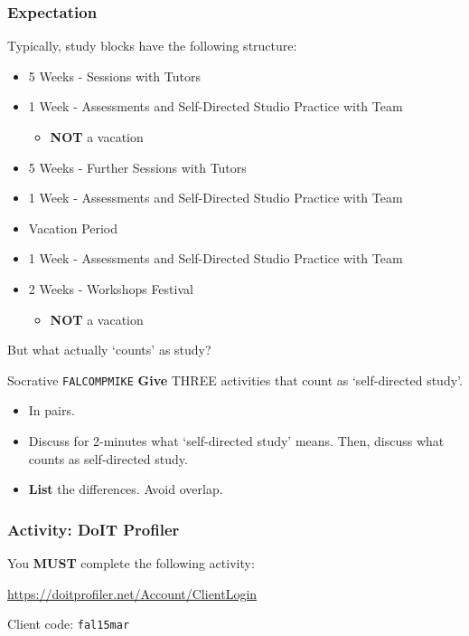 \begin{frame}
	\frametitle{Expectation}
	
	Typically, study blocks have the following structure:
	
	\begin{itemize}
		\item 5 Weeks - Sessions with Tutors
		\item 1 Week - Assessments and Self-Directed Studio Practice with Team
		\begin{itemize}
			\item \textbf{NOT} a vacation
		\end{itemize}
		\item 5 Weeks - Further Sessions with Tutors
		\item 1 Week - Assessments and Self-Directed Studio Practice with Team
		\item Vacation Period
		\item 1 Week - Assessments  and Self-Directed Studio Practice with Team
		\item 2 Weeks - Workshops Festival
		\begin{itemize}
			\item \textbf{NOT} a vacation
		\end{itemize}
	\end{itemize}
	
	But what actually `counts' as study?

\end{frame}

\begin{frame}{Socrative \texttt{FALCOMPMIKE}}
	\textbf{Give} THREE activities that count as `self-directed study'.
	
	\begin{itemize}
		\item In pairs.
		\item Discuss for 2-minutes what `self-directed study' means. Then, discuss what counts as self-directed study.
		\item \textbf{List} the differences. Avoid overlap.
	\end{itemize}
\end{frame}


\begin{frame}
	\frametitle{Activity: DoIT Profiler}
	
	You \textbf{MUST} complete the following activity:
	
	\vspace{2em}
	
	\url{https://doitprofiler.net/Account/ClientLogin}
	
	\vspace{2em}
	
	Client code: \texttt{fal15mar}

\end{frame}

